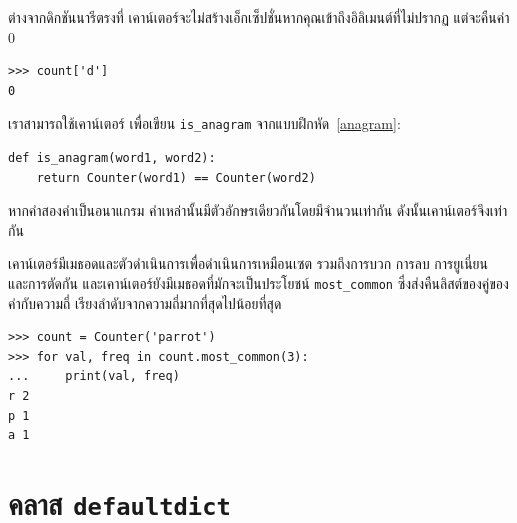 ต่างจากดิกชันนารีตรงที่ เคาน์เตอร์จะไม่สร้างเอ็กเซ็ปชั่นหากคุณเข้าถึงอิลิเมนต์ที่ไม่ปรากฏ แต่จะคืนค่า 0

\begin{verbatim}
>>> count['d']
0
\end{verbatim}

เราสามารถใช้เคาน์เตอร์ เพื่อเขียน \verb"is_anagram" จากแบบฝึกหัด~\ref{anagram}:

\begin{verbatim}
def is_anagram(word1, word2):
    return Counter(word1) == Counter(word2)
\end{verbatim}

หากคำสองคำเป็นอนาแกรม คำเหล่านั้นมีตัวอักษรเดียวกันโดยมีจำนวนเท่ากัน ดังนั้นเคาน์เตอร์จึงเท่ากัน

เคาน์เตอร์มีเมธอดและตัวดำเนินการเพื่อดำเนินการเหมือนเซต รวมถึงการบวก การลบ การยูเนี่ยน และการตัดกัน และเคาน์เตอร์ยังมีเมธอดที่มักจะเป็นประโยชน์ 
\verb"most_common" ซึ่งส่งคืนลิสต์ของคู่ของค่ากับความถี่ เรียงลำดับจากความถี่มากที่สุดไปน้อยที่สุด


\begin{verbatim}
>>> count = Counter('parrot')
>>> for val, freq in count.most_common(3):
...     print(val, freq)
r 2
p 1
a 1
\end{verbatim}



\section{คลาส {\tt defaultdict}}


